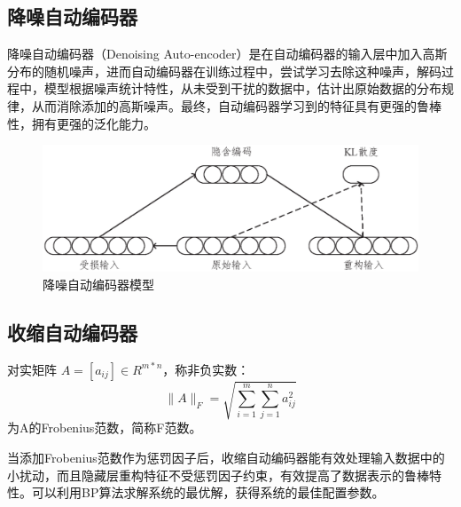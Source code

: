 \documentclass[oneside]{ZJUthesis}
\begin{document}
\subsection{降噪自动编码器}
降噪自动编码器（Denoising Auto-encoder）是在自动编码器的输入层中加入高斯分布的随机噪声，进而自动编码器在训练过程中，尝试学习去除这种噪声，解码过程中，模型根据噪声统计特性，从未受到干扰的数据中，估计出原始数据的分布规律，从而消除添加的高斯噪声。最终，自动编码器学习到的特征具有更强的鲁棒性，拥有更强的泛化能力\cite{28}。
\begin{figure}[H]
\centering
\includegraphics[scale=0.6]{./Pictures/deAE.eps}
\caption{降噪自动编码器模型\label{fig:tanh}}
\end{figure}

\subsection{收缩自动编码器}
\begin{defn}[Frobenius范数]
	对实矩阵 $A=[a_{ij}] \in R^{m*n}$，称非负实数：
	\begin{equation}
	\|A\|_F=\sqrt{\sum\limits_{i=1}^{m}\sum\limits_{j=1}^{n}{a_{ij}^2}}
	\end{equation}
	为A的Frobenius范数，简称F范数。
\end{defn}
当添加Frobenius范数作为惩罚因子后，收缩自动编码器能有效处理输入数据中的小扰动，而且隐藏层重构特征不受惩罚因子约束，有效提高了数据表示的鲁棒特性。可以利用BP算法求解系统的最优解，获得系统的最佳配置参数\cite{32}。
\end{document}

